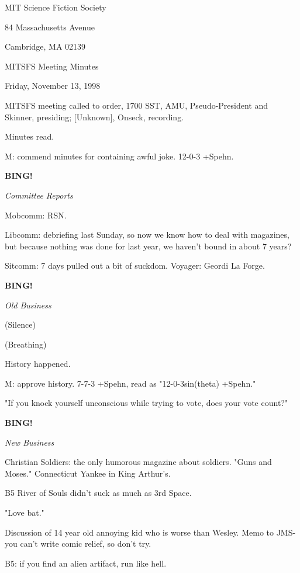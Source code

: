 \documentclass[12pt]{article}
\newcommand{\bing}{{\bf BING!} }
\newcommand{\goto}[1]{\bing \vskip 12pt \centerline{{\em{#1}}}}
\begin{document}
\begin{center}

MIT Science Fiction Society 

84 Massachusetts Avenue

Cambridge, MA 02139

\vspace{12pt}

MITSFS Meeting Minutes 

Friday, November 13, 1998

\end{center}
 
\vspace{18pt}

\setlength{\parskip}{6pt}

\noindent
MITSFS meeting called to order, 1700 SST,
AMU, Pseudo-President and Skinner, presiding; [Unknown], Onseck, recording.

Minutes read.

M: commend minutes for containing awful joke. 12-0-3 +Spehn.

\goto{Committee Reports}

Mobcomm: RSN.

Libcomm: debriefing last Sunday, so now we know how to deal with magazines, but because nothing was done for last year, we haven't bound in about 7 years?

Sitcomm: 7 days pulled out a bit of suckdom. Voyager: Geordi La Forge.

\goto{Old Business}

(Silence)

(Breathing)

History happened.

M: approve history. 7-7-3 +Spehn, read as "12-0-3sin(theta) +Spehn."

"If you knock yourself unconscious while trying to vote, does your vote count?"

\goto{New Business}

Christian Soldiers: the only humorous magazine about soldiers. "Guns and Moses." Connecticut Yankee in King Arthur's.

B5 River of Souls didn't suck as much as 3rd Space.

"Love bat."

Discussion of 14 year old annoying kid who is worse than Wesley. Memo to JMS- you can't write comic relief, so don't try.

B5: if you find an alien artifact, run like hell.
\end{document}
